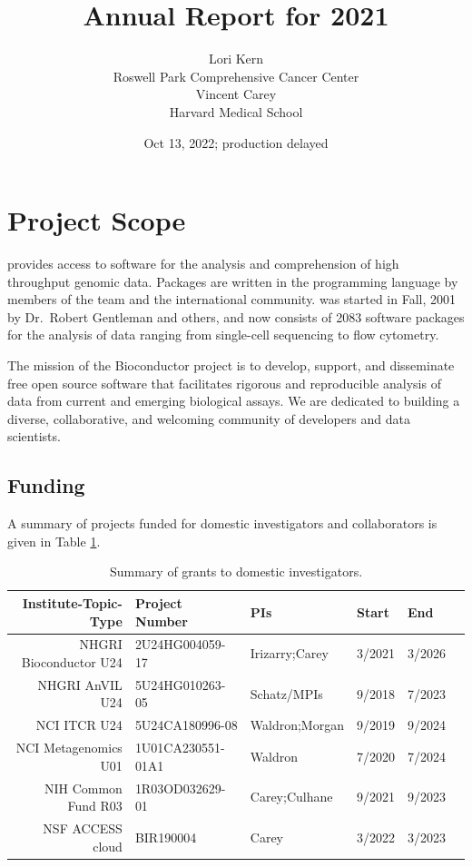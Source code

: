 \documentclass[letterpaper]{article}
\title{\Bioconductor{} Annual Report for 2021}
\author{Lori Kern\\ Roswell Park Comprehensive Cancer Center \\ Vincent Carey \\ Harvard Medical School}
\date{Oct 13, 2022; production delayed}
\begin{document}
\maketitle

\tableofcontents

\section{Project Scope}

\Bioconductor{} provides access to software for the analysis and
comprehension of high throughput genomic data. Packages are written in
the \R{} programming language by members of the \Bioconductor{} team
and the international community. \Bioconductor{} was started in Fall,
2001 by Dr.\ Robert Gentleman and others, and now consists of 2083
software packages for the analysis of data ranging from single-cell
sequencing to flow cytometry.

The mission of the Bioconductor project is to develop, support, and disseminate
free open source software that facilitates rigorous and reproducible analysis of
data from current and emerging biological assays. We are dedicated to building a
diverse, collaborative, and welcoming community of developers and data
scientists.

\subsection{Funding}

A summary of projects funded for domestic investigators and 
collaborators is given in Table \ref{gra}.

\begin{table}[ht]
\centering
\begin{tabular}{rlllll}
  \hline
 Institute-Topic-Type & Project Number & PIs & Start & End \\ 
  \hline
 NHGRI Bioconductor U24 & 2U24HG004059-17 & Irizarry;Carey & 3/2021 & 3/2026 \\ 
 NHGRI AnVIL U24 & 5U24HG010263-05 & Schatz/MPIs & 9/2018 & 7/2023 \\ 
 NCI ITCR U24 & 5U24CA180996-08 & Waldron;Morgan & 9/2019 & 9/2024  \\ 
 NCI Metagenomics U01 & 1U01CA230551-01A1 & Waldron & 7/2020 & 7/2024 \\ 
 NIH Common Fund R03 & 1R03OD032629-01 & Carey;Culhane & 9/2021 & 9/2023 \\ 
 NSF ACCESS cloud & BIR190004 & Carey & 3/2022 & 3/2023 \\ 
   \hline
\end{tabular}
\caption{Summary of grants to domestic investigators.}
\label{gra}
\end{table}
\end{document}
